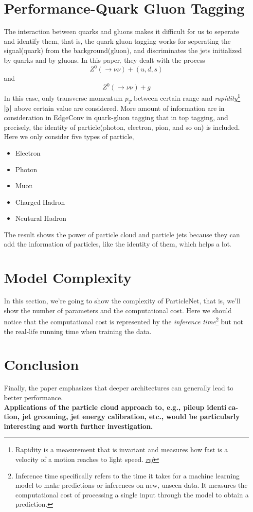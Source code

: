 \documentclass[12pt]{article}
\numberwithin{equation}{section}
\begin{document}
\section{Performance-Quark Gluon Tagging}

The interaction between quarks and gluons makes it difficult for us to seperate and identify them, that is, the quark gluon tagging works for seperating the signal(quark) from the background(gluon), and discriminates the jets initialized by quarks and by gluons. In this paper, they dealt with the process \[ Z^0 \left(\rightarrow \nu\nu\right) + (u, d, s) \] and \[ Z^0 \left(\rightarrow \nu\nu\right) + g \]
In this case, only transverse momentum $p_T$ between certain range and \textit{rapidity}\footnote{Rapidity is a measurement that is invariant and measures how fast is a velocity of a motion reaches to light speed. \href{https://en.wikipedia.org/wiki/Rapidity}{\textit{ref}}} $\abs{y}$ above certain value are considered. More amount of information are in consideration in EdgeConv in quark-gluon tagging that in top tagging, and precisely, the identity of particle(photon, electron, pion, and so on) is included. Here we only consider five types of particle,

\begin{itemize}
    \item Electron
    \item Photon
    \item Muon
    \item Charged Hadron 
    \item Neutural Hadron 
\end{itemize}

The result shows the power of particle cloud and particle jets because they can add the information of particles, like the identity of them, which helps a lot.

\section{Model Complexity}

In this section, we're going to show the complexity of ParticleNet, that is, we'll show the number of parameters and the computational cost. Here we should notice that the computational cost is represented by the \textit{inference time}\footnote{Inference time specifically refers to the time it takes for a machine learning model to make predictions or inferences on new, unseen data. It measures the computational cost of processing a single input through the model to obtain a prediction.}
 but not the real-life running time when training the data.

\section{Conclusion}

Finally, the paper emphasizes that deeper architectures can generally lead to
better performance.
\\
\indent \textbf{Applications
of the particle cloud approach to, e.g., pileup identica-
tion, jet grooming, jet energy calibration, etc., would be
particularly interesting and worth further investigation.}
\end{document}
